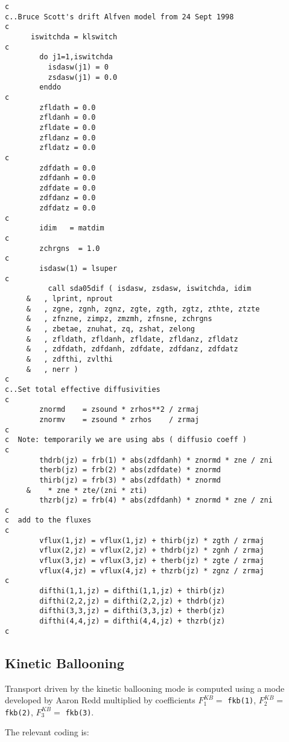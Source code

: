 \begin{verbatim}
c
c..Bruce Scott's drift Alfven model from 24 Sept 1998
c
      iswitchda = klswitch
c
        do j1=1,iswitchda
          isdasw(j1) = 0
          zsdasw(j1) = 0.0
        enddo
c
        zfldath = 0.0
        zfldanh = 0.0
        zfldate = 0.0
        zfldanz = 0.0
        zfldatz = 0.0
c
        zdfdath = 0.0
        zdfdanh = 0.0
        zdfdate = 0.0
        zdfdanz = 0.0
        zdfdatz = 0.0
c
        idim   = matdim
c
        zchrgns  = 1.0
c
        isdasw(1) = lsuper
c
          call sda05dif ( isdasw, zsdasw, iswitchda, idim
     &   , lprint, nprout
     &   , zgne, zgnh, zgnz, zgte, zgth, zgtz, zthte, ztzte
     &   , zfnzne, zimpz, zmzmh, zfnsne, zchrgns
     &   , zbetae, znuhat, zq, zshat, zelong
     &   , zfldath, zfldanh, zfldate, zfldanz, zfldatz
     &   , zdfdath, zdfdanh, zdfdate, zdfdanz, zdfdatz
     &   , zdfthi, zvlthi
     &   , nerr )
c
c..Set total effective diffusivities
c
        znormd    = zsound * zrhos**2 / zrmaj
        znormv    = zsound * zrhos    / zrmaj
c
c  Note: temporarily we are using abs ( diffusio coeff )
c
        thdrb(jz) = frb(1) * abs(zdfdanh) * znormd * zne / zni
        therb(jz) = frb(2) * abs(zdfdate) * znormd
        thirb(jz) = frb(3) * abs(zdfdath) * znormd
     &    * zne * zte/(zni * zti)
        thzrb(jz) = frb(4) * abs(zdfdanh) * znormd * zne / zni
c
c  add to the fluxes
c
        vflux(1,jz) = vflux(1,jz) + thirb(jz) * zgth / zrmaj
        vflux(2,jz) = vflux(2,jz) + thdrb(jz) * zgnh / zrmaj
        vflux(3,jz) = vflux(3,jz) + therb(jz) * zgte / zrmaj
        vflux(4,jz) = vflux(4,jz) + thzrb(jz) * zgnz / zrmaj
c
        difthi(1,1,jz) = difthi(1,1,jz) + thirb(jz)
        difthi(2,2,jz) = difthi(2,2,jz) + thdrb(jz)
        difthi(3,3,jz) = difthi(3,3,jz) + therb(jz)
        difthi(4,4,jz) = difthi(4,4,jz) + thzrb(jz)
c

\end{verbatim}

\subsection{Kinetic Ballooning}

Transport driven by the kinetic ballooning mode is computed using
a mode developed by Aaron Redd \cite{redd98b}
multiplied by coefficients $F_1^{KB}=$ {\tt fkb(1)}, $F_2^{KB}=$ {\tt fkb(2)},
$F_3^{KB}=$ {\tt fkb(3)}.

The relevant coding is:

